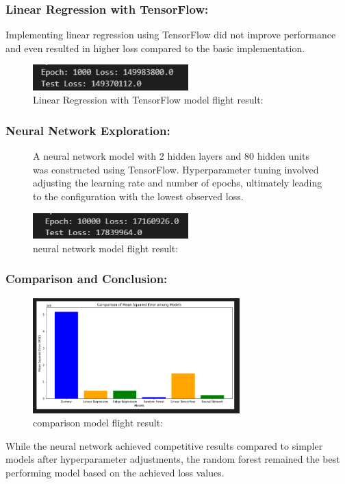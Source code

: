 \documentclass{article}
\begin{document}
\subsubsection{Linear Regression with TensorFlow: }Implementing linear regression using TensorFlow did not improve performance and even resulted in higher loss compared to the basic implementation.
\begin{figure}[H]
    \caption{Linear Regression with TensorFlow model flight result:}
    \centering
    \includegraphics[width=6cm]{../imgFolder/linearRegressionTensorflowFlight.png}
\end{figure}

\subsubsection{Neural Network Exploration:}

\begin{figure}[H]
    A neural network model with 2 hidden layers and 80 hidden units was constructed using TensorFlow. Hyperparameter tuning involved adjusting the learning rate and number of epochs, ultimately leading to the configuration with the lowest observed loss.
    \caption{neural network model flight result:}
    \centering
    \includegraphics[width=6cm]{../imgFolder/neuronNetworkFlight.png}
\end{figure}

\subsubsection{Comparison and Conclusion:}
\begin{figure}[H]
    \caption{comparison model flight result:}
    \centering
    \includegraphics[width=8cm]{../imgFolder/comparisonFlight.png}
\end{figure}
While the neural network achieved competitive results compared to simpler models after hyperparameter adjustments, the random forest remained the best performing model based on the achieved loss values.\\
\end{document}

